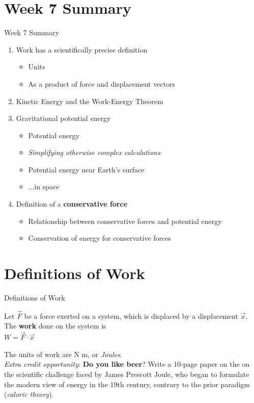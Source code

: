 \documentclass{beamer}
\begin{document}
\section{Week 7 Summary}

\begin{frame}{Week 7 Summary}
\begin{enumerate}
\item \alert{Work} has a scientifically precise definition
\begin{itemize}
\item Units
\item As a product of force and displacement vectors
\end{itemize}
\item Kinetic Energy and the \alert{Work-Energy Theorem}
\item Gravitational potential energy
\begin{itemize}
\item Potential energy
\item \textit{Simplifying otherwise complex calculations}
\item Potential energy near Earth's surface
\item ...in space
\end{itemize}
\item Definition of a \textbf{conservative force}
\begin{itemize}
\item Relationship between conservative forces and potential energy
\item Conservation of energy for conservative forces
\end{itemize}
\end{enumerate}
\end{frame}

\section{Definitions of Work}

\begin{frame}{Definitions of Work}
\begin{tcolorbox}[colback=white,colframe=red!40!blue,title=Physical Definition of Work]
\alert{Let $\vec{F}$ be a force exerted on a system, which is displaced by a displacement $\vec{x}$.  The \textbf{work} done on the system is} \\
\alert{$W = \vec{F} \cdot \vec{x}$} \\
\end{tcolorbox}
The units of work are N m, or \textit{Joules}. \\
\textit{Extra credit opportunity}: \textbf{Do you like beer}?  Write a 10-page paper on the on the scientific challenge faced by James Prescott Joule, who began to formulate the modern view of energy in the 19th century, contrary to the prior paradigm (\textit{caloric theory}).
\end{frame}
\end{document}
